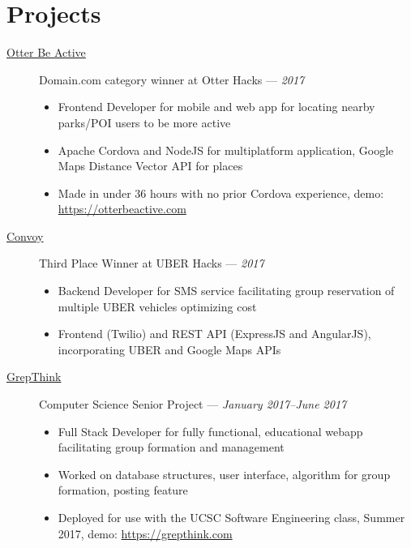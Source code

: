 \documentclass[10pt]{article}
\begin{document}
\section*{Projects}
\begin{description}
  \item[\href{https://github.com/4U6U57/otterhacks17.otterbeactive}{Otter Be
    Active}] Domain.com category winner at Otter Hacks --- \textit{2017}
    \begin{itemize}
      \item Frontend Developer for mobile and web app for locating nearby
        parks/POI
        users to be more active
      \item Apache Cordova and NodeJS for multiplatform application, Google Maps
        Distance Vector API for places
      \item Made in under 36 hours with no prior Cordova experience, demo:
        \url{https://otterbeactive.com}
    \end{itemize}
  \item[\href{https://github.com/4U6U57/uberhacks17.convoy}{Convoy}] Third
    Place Winner at UBER Hacks --- \textit{2017}
    \begin{itemize}
      \item Backend Developer for SMS service facilitating group reservation of
        multiple UBER vehicles optimizing cost
      \item Frontend (Twilio) and REST API (ExpressJS and AngularJS),
        incorporating UBER and Google Maps APIs
    \end{itemize}
  \item[\href{https://github.com/grepthink/grepthink}{GrepThink}] Computer
    Science Senior Project --- \textit{January 2017--June 2017}
    \begin{itemize}
      \item Full Stack Developer for fully functional, educational webapp
        facilitating group formation and management
      \item Worked on database structures, user interface, algorithm for group
        formation, posting feature
      \item Deployed for use with the UCSC Software Engineering class, Summer
        2017, demo: \url{https://grepthink.com}
    \end{itemize}
\end{description}
\end{document}
